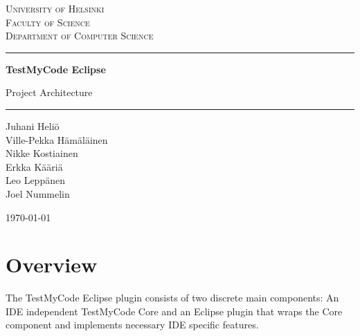 \documentclass[12pt,a4paper,english,leqno]{article}
\begin{document}
\parskip 2mm
\parindent 0mm


\begin{titlepage}
  \setlength{\parindent}{0mm}
  \sloppy
  \large \textsc{University of Helsinki \\
  				 Faculty of Science\\
                 Department of Computer Science}
  \vspace{5mm}

  \hrule height3pt
  \vspace{20mm}

  \begin{center}
	\vfill  
  
    \begin{Huge} 
    \textbf{TestMyCode Eclipse}\\
    \end{Huge}
    \begin{LARGE}
    Project Architecture
    \end{LARGE}
    \vspace{20mm}

    \vfill

  \end{center}
  \hrule height2pt
  \vspace{5mm}

  \begin{small}
  Juhani Heliö\\
  Ville-Pekka Hämäläinen\\
  Nikke Kostiainen\\
  Erkka Kääriä\\
  Leo Leppänen\\
  Joel Nummelin\end{small} \hfill \today
  
\end{titlepage}

\tableofcontents

\pagebreak


\section{Overview}

The TestMyCode Eclipse plugin consists of two discrete main components: An IDE independent TestMyCode Core and an Eclipse plugin that wraps the Core component and implements necessary IDE specific features.
\end{document}
